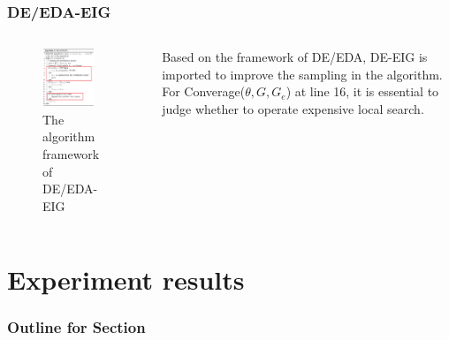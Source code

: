 \documentclass[xcolor=dvipsnames]{beamer}
\begin{document}
    \begin{frame}
    \frametitle{DE/EDA-EIG}
    \begin{columns}
        \begin{column}{0.5\textwidth}
        \begin{figure}[H]
            \graphicspath{{figs/}}
            \includegraphics[width=0.8\textwidth]{deeda-eig.png}
            \caption{The algorithm framework of DE/EDA-EIG}
        \end{figure}
    \end{column}
    \begin{column}{0.5\textwidth}
    Based on the framework of DE/EDA, DE-EIG is imported to improve the sampling in the algorithm. For Converage($\theta, G, G_e$) at line 16, it is essential to judge whether to operate expensive local search.
    \end{column}
    \end{columns}
    \end{frame}



    \section{Experiment results}
    \begin{frame}
      \frametitle{Outline for Section \thesection}
      \tableofcontents[currentsection]
    \end{frame}
    
\end{document}
